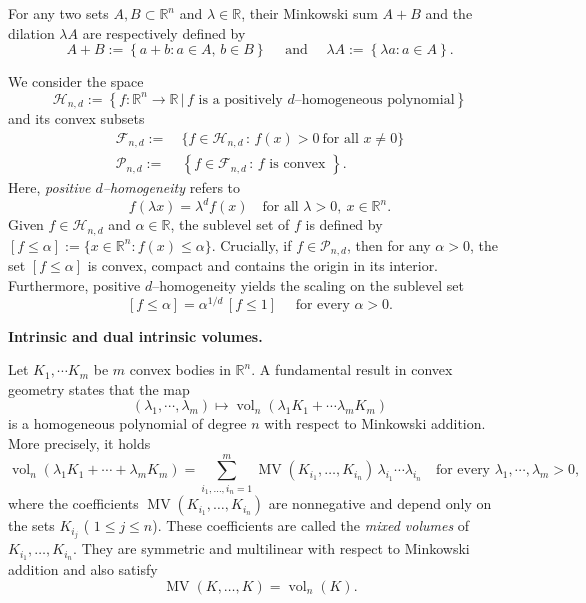 \documentclass[11pt]{article}
\theoremstyle{definition}
\numberwithin{equation}{section}
\newcommand{\R}{\mathbb{R}}
\newcommand{\cH}{\mathcal{H}}        %
\newcommand{\cF}{\mathcal{F}}
\newcommand{\cP}{\mathcal{P}}        %
\DeclareMathOperator{\vol}{vol}
\DeclareMathOperator{\MV}{MV}
\begin{document}
\medskip

For any two sets $A, B \subset \R^n$ and $\lambda \in \R$, their Minkowski sum $A + B$ and the dilation $\lambda A$ are respectively defined by
\[
A + B := \left\{ a + b : a \in A, \, b \in B \right\} \quad \text{ and  } \quad \lambda A := \left\{ \lambda a : a \in A \right\}.
\]

\medskip

We consider the space
\[
    \cH_{n, d} := \left\{ f : \R^n \to \R \, \big\vert \,  f \text{ is a positively $d$--homogeneous polynomial} \right\}
\]
and its convex subsets
\begin{align*}
	\cF_{n, d} := & ~ \{ f \in \cH_{n, d} \, : \,   f(x) > 0 \ \text{for all } x \ne 0 \} \\
	\cP_{n,d} := & ~ \left\{ f \in \cF_{n, d} \, : \, f \text{ is convex } \right\}.
\end{align*}
Here, \textit{positive $d$--homogeneity} refers to
\[
f(\lambda x) = \lambda^d f(x) \quad \text{for all } \lambda > 0,\ x \in \R^n .
\]
Given $f \in \cH_{n,d}$ and $\alpha \in \R$, the sublevel set of $f$ is defined by $[f \le \alpha] := \{ x \in \R^n : f(x) \le \alpha \}.$
Crucially, if $f \in \cP_{n,d}$, then for any $\alpha > 0$, the set $[f \le \alpha]$ is convex, compact and contains the origin in its interior.  
Furthermore, positive $d$--homogeneity yields the scaling on the sublevel set
\[
[f \le \alpha] = \alpha^{1/d} \,[f \le 1] \quad \text{ for every } \alpha > 0.
\]


\textbf{Intrinsic and dual intrinsic volumes.}

\medskip

Let $K_1, \cdots K_m$ be $m$ convex bodies in $\R^n$.
A fundamental result in convex geometry states that the map 
\[
(\lambda_1, \cdots, \lambda_m) \mapsto \vol_n(\lambda_1 K_1 + \cdots \lambda_m K_m)
\]
is a homogeneous polynomial of degree $n$ with respect to Minkowski addition.
More precisely, it holds
\[
\vol_n(\lambda_1 K_1 + \cdots + \lambda_m K_m)
= \sum_{i_1,\dots,i_n=1}^m \MV(K_{i_1},\dots,K_{i_n}) \, \lambda_{i_1}\cdots \lambda_{i_n} \quad \text{for every $\lambda_1, \cdots, \lambda_m > 0$},
\]
where the coefficients $\MV (K_{i_1},\dots,K_{i_n})$ are nonnegative and depend only on the sets $K_{i_j}$ ( $1 \le j \le n$).  
These coefficients are called the \emph{mixed volumes} of $K_{i_1},\dots,K_{i_n}$.  
They are symmetric and multilinear with respect to Minkowski addition and also satisfy
\[
\MV (K,\dots,K) = \vol_n(K).
\]
\end{document}
